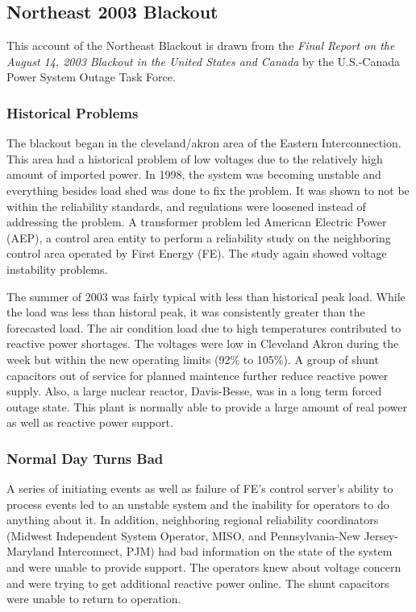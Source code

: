 
\subsection{Northeast 2003 Blackout}

This account of the Northeast Blackout is drawn from the \textit{Final Report on the August 14, 2003 Blackout in the United States and Canada} by the U.S.-Canada Power System Outage Task Force.\cite{northeast_2003}  

\subsubsection{Historical Problems}
The blackout began in the cleveland/akron area of the Eastern Interconnection.  This area had a historical problem of low voltages due to the relatively high amount of imported power.  In 1998, the system was becoming unstable and everything besides load shed was done to fix the problem.  It was shown to not be within the reliability standards, and regulations were loosened instead of addressing the problem.  A transformer problem led American Electric Power (AEP), a control area entity to perform a reliability study on the neighboring control area operated by First Energy (FE).  The study again showed voltage instability problems.

The summer of 2003 was fairly typical with less than historical peak load.  While the load was less than historal peak, it was consistently greater than the forecasted load.  The air condition load due to high temperatures contributed to reactive power shortages.  The voltages were low in Cleveland Akron during the week but within the new operating limits (92\% to 105\%).  A group of shunt capacitors out of service for planned maintence further reduce reactive power supply.  Also, a large nuclear reactor, Davis-Besse, was in a long term forced outage state.  This plant is normally able to provide a large amount of real power as well as reactive power support.

\subsubsection{Normal Day Turns Bad}
A series of initiating events as well as failure of FE's control server's ability to process events led to an unstable system and the inability for operators to do anything about it.  In addition, neighboring regional reliability coordinators (Midwest Independent System Operator, MISO, and Pennsylvania-New Jersey-Maryland Interconnect, PJM) had bad information on the state of the system and were unable to provide support.  The operators knew about voltage concern and were trying to get additional reactive power online.  The shunt capacitors were unable to return to operation.


